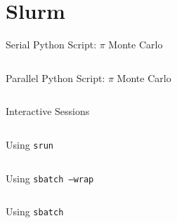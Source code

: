 \documentclass[aspectratio=169]{beamer}
\begin{document}
\section{Slurm}

\begin{frame}{Serial Python Script: \(\pi\) Monte Carlo}
\begin{listing}[H]
\inputminted{python}{examples/slurm_tutorial/pi_monte_carlo.py}
\caption{Serial algorithm to estimate the value of Pi.}
\end{listing}
\end{frame}

\begin{frame}{Parallel Python Script: \(\pi\) Monte Carlo}
\begin{listing}[H]
\inputminted{python}{examples/slurm_tutorial/pi_monte_carlo_shared.py}
\caption{Parallel algorithm to estimate the value of Pi.}
\end{listing}
\end{frame}

\begin{frame}{Interactive Sessions}
\begin{listing}[H]
\inputminted{sh}{examples/slurm_tutorial/01_interactive_session}
\caption{Using \texttt{srun} to log into a compute node to run commands interactively.}
\end{listing}
\end{frame}

\begin{frame}{Using \texttt{srun}}
\begin{listing}[H]
\inputminted{sh}{examples/slurm_tutorial/02_srun}
\caption{Using \texttt{srun} to run commands directly on a compute node.}
\end{listing}
\end{frame}

\begin{frame}{Using \texttt{sbatch --wrap}}
\begin{listing}[H]
\inputminted{sh}{examples/slurm_tutorial/03_sbatch_wrap}
\caption{Using \texttt{sbatch --wrap} wrap a commands in an \texttt{sbatch} script that is then submitted to the queue can run non-interactively.}
\end{listing}
\end{frame}

\begin{frame}{Using \texttt{sbatch}}
\begin{listing}[H]
\inputminted{sh}{examples/slurm_tutorial/04_sbatch_htc.sbatch}
\caption{Using \texttt{sbatch} run serial computations via an \texttt{sbatch} script.}
\end{listing}
\end{frame}
\end{document}
